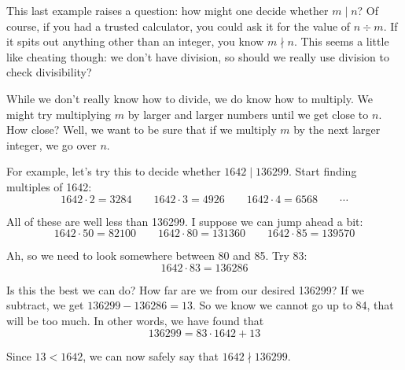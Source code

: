 \documentclass[10pt,]{book}
\theoremstyle{plain}
\theoremstyle{definition}
\theoremstyle{definition}
\theoremstyle{definition}
\numberwithin{equation}{chapter}
\newcommand{\lt}{ < }
\begin{document}
This last example raises a question: how might one decide whether \(m \mid n\)? Of course, if you had a trusted calculator, you could ask it for the value of \(n \div m\). If it spits out anything other than an integer, you know \(m \nmid n\). This seems a little like cheating though: we don't have division, so should we really use division to check divisibility?
%
\par

While we don't really know how to divide, we do know how to multiply. We might try multiplying \(m\) by larger and larger numbers until we get close to \(n\). How close? Well, we want to be sure that if we multiply \(m\) by the next larger integer, we go over \(n\).
%
\par

For example, let's try this to decide whether \(1642 \mid 136299\). Start finding multiples of 1642:
\begin{equation*}
  1642 \cdot 2 = 3284 \qquad 1642 \cdot 3 = 4926 \qquad 1642\cdot 4 = 6568 \qquad \cdots
\end{equation*}
%
\par

All of these are well less than 136299. I suppose we can jump ahead a bit:
\begin{equation*}
  1642 \cdot 50 = 82100 \qquad 1642 \cdot 80 = 131360 \qquad 1642 \cdot 85 = 139570
\end{equation*}
%
\par

Ah, so we need to look somewhere between 80 and 85. Try 83:
\begin{equation*}
  1642 \cdot 83 = 136286
\end{equation*}
%
\par

Is this the best we can do? How far are we from our desired 136299? If we subtract, we get \(136299 - 136286 = 13\). So we know we cannot go up to 84, that will be too much. In other words, we have found that
\begin{equation*}
  136299 = 83 \cdot 1642 + 13
\end{equation*}
%
\par

Since \(13 \lt  1642\), we can now safely say that \(1642 \nmid 136299\).
%
\par
\end{document}

